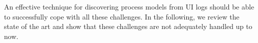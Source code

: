 An effective technique for discovering process models from UI logs should be able to successfully cope with all these challenges. In the following, we review the state of the art and show that these challenges are not adequately handled up to now. 